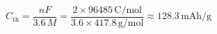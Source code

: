 \documentclass[preview]{standalone}
\begin{document}
\[C_\text{th} = \frac{nF}{3.6\,M} = \frac{2 \times 96485\,\text{C/mol}}{3.6 \times 417.8\,\text{g/mol}} \approx 128.3\,\text{mAh/g} \tag{6.2}\]
\end{document}
